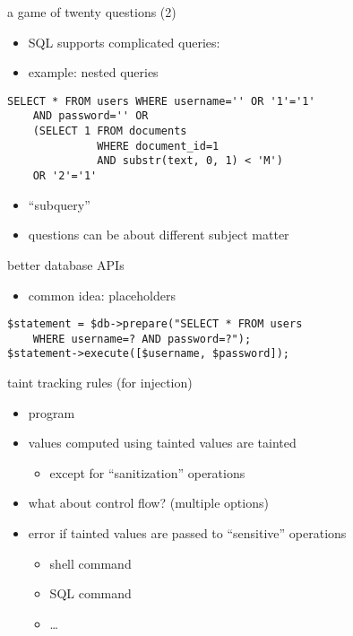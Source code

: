 \begin{frame}[fragile,label=twentyQ2]{a game of twenty questions (2)}
    \begin{itemize}
    \item SQL supports complicated queries:
    \item example: nested queries
    \end{itemize}
\begin{verbatim}
SELECT * FROM users WHERE username='' OR '1'='1'
    AND password='' OR
    (SELECT 1 FROM documents
              WHERE document_id=1
              AND substr(text, 0, 1) < 'M')
    OR '2'='1'
\end{verbatim}
    \begin{itemize}
    \item ``subquery''
    \item questions can be about different subject matter
    \end{itemize}
\end{frame}

\begin{frame}[fragile,label=betterDBAPI]{better database APIs}
    \begin{itemize}
        \item common idea: placeholders
    \end{itemize}
\begin{verbatim}
$statement = $db->prepare("SELECT * FROM users
    WHERE username=? AND password=?");
$statement->execute([$username, $password]);
\end{verbatim}
\end{frame}

\begin{frame}{taint tracking rules (for injection)}
    \begin{itemize}
        \item program 
        \item {} values computed using tainted values are tainted
            \begin{itemize}
            \item except for  ``sanitization'' operations
            \end{itemize}
        \item what about control flow? (multiple options)
        \item error if tainted values are passed to ``sensitive'' operations
            \begin{itemize}
            \item shell command
            \item SQL command
            \item \ldots
            \end{itemize}
    \end{itemize}
\end{frame}


